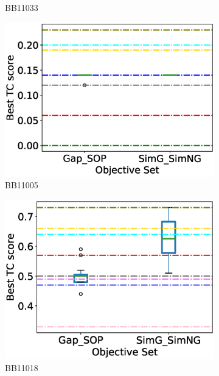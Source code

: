 \begin{figure}[!htbp]
\begin{adjustwidth}{-1cm}{-1cm}
\begin{subfigure}[b]{0.26\textwidth}
			\caption{BB11033}
		\end{subfigure}
		\begin{subfigure}{0.26\textwidth}
			\includegraphics[width=\columnwidth]{Figure/summary/precomputedInit/Balibase/BB11005_objset_tc_rank_2}
			\caption{BB11005}
		\end{subfigure}    
		\begin{subfigure}{0.26\textwidth}
			\includegraphics[width=\columnwidth]{Figure/summary/precomputedInit/Balibase/BB11018_objset_tc_rank_2}
			\caption{BB11018}
		\end{subfigure}
		\begin{subfigure}{0.26\textwidth}

\end{subfigure}
\end{adjustwidth}
\end{figure}
